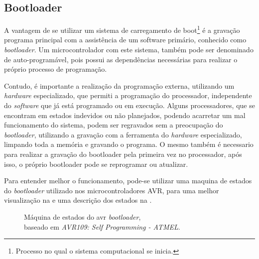 \subsection{Bootloader}

A vantagem de se utilizar um sistema de carregamento de boot\footnote{Processo no qual o sistema computacional se inicia.} é
a gravação programa principal com a assistência de um software primário, conhecido como \textit{bootloader}. Um microcontrolador
com este sistema, também pode ser denominado de auto-programável, pois possui as dependências necessárias para realizar o próprio
processo de programação.

Contudo, é importante a realização da programação externa, utilizando um \textit{hardware} especializado, que permiti a programação do processador, independente do \textit{software} que já está programado ou em execução. Alguns processadores, que se encontram em estados indevidos ou não planejados, podendo acarretar um mal funcionamento do sistema, podem ser regravados sem a preocupação do \textit{bootloader}, utilizando a gravação com a ferramenta do \textit{hardware} especializado, limpando toda a memória e gravando o programa. O mesmo também é necessario para realizar a gravação do bootloader pela primeira vez no processador, após isso, o próprio bootloader pode se reprogramar ou atualizar.

Para entender melhor o funcionamento, pode-se utilizar uma maquina de estados do \textit{bootloader} utilizado nos microcontroladores
AVR, para uma melhor visualização na  e uma descrição dos estados na .

\begin{figure}[ht!]
  \centering
  \caption[Máquina de estados do avr \textit{bootloader}]{\label{fig:sm_bootloader}}{Máquina de estados
  do avr \textit{bootloader},\\ baseado em \textit{AVR109: Self Programming - ATMEL}.}
\end{figure}

